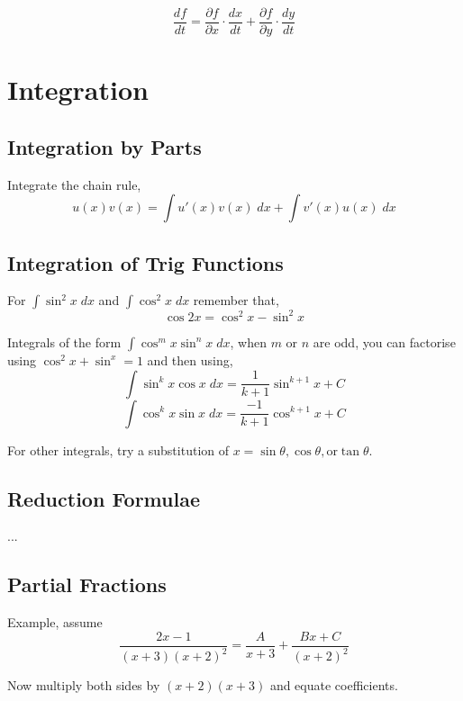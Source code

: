 \documentclass[a4paper,10pt]{article}
\begin{document}
$$\frac{df}{dt} = \frac{\partial f}{\partial x} \cdot \frac{dx}{dt} + \frac{\partial f}{\partial y} \cdot \frac{dy}{dt}$$

\section*{Integration}
\subsection*{Integration by Parts}
Integrate the chain rule,
$$u(x)v(x) = \int u'(x)v(x)\; dx + \int v'(x)u(x)\; dx$$

\subsection*{Integration of Trig Functions}
For $\int \sin^2 x\; dx$ and $\int \cos^2 x\; dx$ remember that,\\
$$\cos 2x = \cos^2 x - \sin^2 x$$

Integrals of the form $\int \cos^m x \sin^n x\; dx$, when $m$ or $n$ are odd, you can factorise using $\cos^2 x + \sin^x = 1$  and then using,
$$\int \sin^k x \cos x\; dx = \frac{1}{k+1} \sin^{k+1} x + C$$
$$\int \cos^k x \sin x\; dx = \frac{-1}{k+1} \cos^{k+1} x + C$$

For other integrals, try a substitution of $x=\sin \theta, \cos \theta, \mbox{or} \tan \theta.$

\subsection*{Reduction Formulae}
...

\subsection*{Partial Fractions}
Example, assume
$$\frac{2x-1}{(x+3)(x+2)^2} = \frac{A}{x+3} + \frac{Bx + C}{(x+2)^2}$$
\begin{comment}
\begin{enumerate}
\renewcommand{\labelenumi}{\roman{enumi})}
 \item $\frac{2x-1}{x+2} = A + \frac{B(x+3)}{x+2}$ subs $x=-3 \to A=7$
 \item $\frac{2x-1}{x+3} = \frac{A(x+2)}{x+3} + B$ subs $x=-2 \to B=-5$
\end{enumerate}
\end{comment}
Now multiply both sides by $(x+2)(x+3)$ and equate coefficients.
\end{document}
